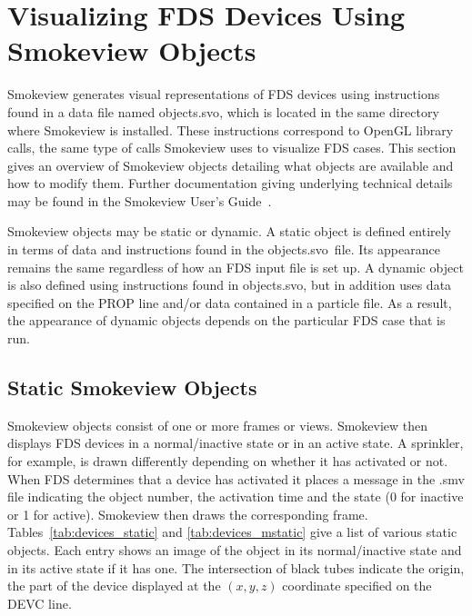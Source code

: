 
\newcommand{\devicewidth}{1.5in}
\newcommand{\boxwidth}{3.0in}
\newcommand{\incgraphics}[1]{
\parbox[c]{\devicewidth}{
\vspace{0.01in}
\texttt{[image: \#1]}
\vspace{0.01in}
}
}

\section{Visualizing FDS Devices Using Smokeview Objects}

Smokeview generates visual representations of FDS devices using instructions found in a data file named
{\ct objects.svo}, which is located in the same directory where Smokeview is installed.  These instructions correspond to OpenGL library calls, the same type of calls Smokeview
uses to visualize FDS cases.  This section gives an overview
of Smokeview objects detailing what objects are available and how to modify them.  Further documentation
giving underlying technical details may be found in the Smokeview User's Guide~\cite{Smokeview_Users_Guide}.

Smokeview objects may be static or dynamic.  A static object is defined entirely in terms of data and instructions
found in the {\ct objects.svo}\ file.  Its appearance remains the same regardless of how an FDS input file is set up.  A
dynamic object is also defined using instructions found in {\ct objects.svo}, but in addition uses data specified on
the {\ct PROP}  line and/or data contained in a particle file.  As a result, the appearance of dynamic
objects depends on the particular FDS case that is run.


\subsection{Static Smokeview Objects}
\label{info:SMOKEVIEW_ID}

Smokeview objects consist of one or more frames or views.  Smokeview then displays FDS devices in a normal/inactive
state or in an active state.  A sprinkler, for example, is drawn differently depending on whether it has activated
or not.  When FDS determines that a device has activated it places a message in the {\ct .smv} file indicating the
object number, the activation time and the state (0 for inactive or 1 for active).  Smokeview then draws the corresponding
frame.  Tables~\ref{tab:devices_static} and \ref{tab:devices_mstatic} give a list of various static objects.  Each entry shows
an image of the object in its normal/inactive state and in its active state if it has one.  The intersection of black tubes
indicate the origin, the part of the device displayed at the $(x,y,z)$ coordinate specified on the {\ct DEVC} line.

